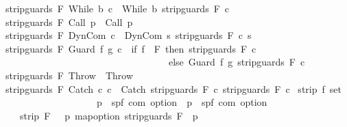\begin{isabellebody}
{\isachardoublequoteopen}strip{\isacharunderscore}guards\ F\ {\isacharparenleft}While\ b\ c{\isacharparenright}\ {\isacharequal}\ While\ b\ {\isacharparenleft}strip{\isacharunderscore}guards\ F\ c{\isacharparenright}{\isachardoublequoteclose}\ {\isacharbar}\isanewline
{\isachardoublequoteopen}strip{\isacharunderscore}guards\ F\ {\isacharparenleft}Call\ p{\isacharparenright}\ {\isacharequal}\ Call\ p{\isachardoublequoteclose}\ {\isacharbar}\isanewline
{\isachardoublequoteopen}strip{\isacharunderscore}guards\ F\ {\isacharparenleft}DynCom\ c{\isacharparenright}\ {\isacharequal}\ DynCom\ {\isacharparenleft}{\isasymlambda}s{\isachardot}\ {\isacharparenleft}strip{\isacharunderscore}guards\ F\ {\isacharparenleft}c\ s{\isacharparenright}{\isacharparenright}{\isacharparenright}{\isachardoublequoteclose}\ {\isacharbar}\isanewline
{\isachardoublequoteopen}strip{\isacharunderscore}guards\ F\ {\isacharparenleft}Guard\ f\ g\ c{\isacharparenright}\ {\isacharequal}\ {\isacharparenleft}if\ f\ {\isasymin}\ F\ then\ strip{\isacharunderscore}guards\ F\ c\isanewline
\ \ \ \ \ \ \ \ \ \ \ \ \ \ \ \ \ \ \ \ \ \ \ \ \ \ \ \ \ \ \ \ \ \ else\ Guard\ f\ g\ {\isacharparenleft}strip{\isacharunderscore}guards\ F\ c{\isacharparenright}{\isacharparenright}{\isachardoublequoteclose}\ {\isacharbar}\isanewline
{\isachardoublequoteopen}strip{\isacharunderscore}guards\ F\ Throw\ {\isacharequal}\ Throw{\isachardoublequoteclose}\ {\isacharbar}\isanewline
{\isachardoublequoteopen}strip{\isacharunderscore}guards\ F\ {\isacharparenleft}Catch\ c\ c\ {\isacharequal}\ Catch\ {\isacharparenleft}strip{\isacharunderscore}guards\ F\ c\ {\isacharparenleft}strip{\isacharunderscore}guards\ F\ c\isanewline
\isanewline
{}\isamarkupfalse%
\ strip{\isacharcolon}{\isacharcolon}\ {\isachardoublequoteopen}{\isacharprime}f\ set\ {\isasymRightarrow}\ \isanewline
\ \ \ \ \ \ \ \ \ \ \ \ \ \ \ \ \ \ \ {\isacharparenleft}{\isacharprime}p\ {\isasymRightarrow}\ {\isacharparenleft}{\isacharprime}s{\isacharcomma}{\isacharprime}p{\isacharcomma}{\isacharprime}f{\isacharparenright}\ com\ option{\isacharparenright}\ {\isasymRightarrow}\ {\isacharparenleft}{\isacharprime}p\ {\isasymRightarrow}\ {\isacharparenleft}{\isacharprime}s{\isacharcomma}{\isacharprime}p{\isacharcomma}{\isacharprime}f{\isacharparenright}\ com\ option{\isacharparenright}{\isachardoublequoteclose}\isanewline
\ \ \ {\isachardoublequoteopen}strip\ F\ {\isasymGamma}\ {\isacharequal}\ {\isacharparenleft}{\isasymlambda}p{\isachardot}\ map{\isacharunderscore}option\ {\isacharparenleft}strip{\isacharunderscore}guards\ F{\isacharparenright}\ {\isacharparenleft}{\isasymGamma}\ p{\isacharparenright}{\isacharparenright}{\isachardoublequoteclose}\isanewline

\end{isabellebody}
